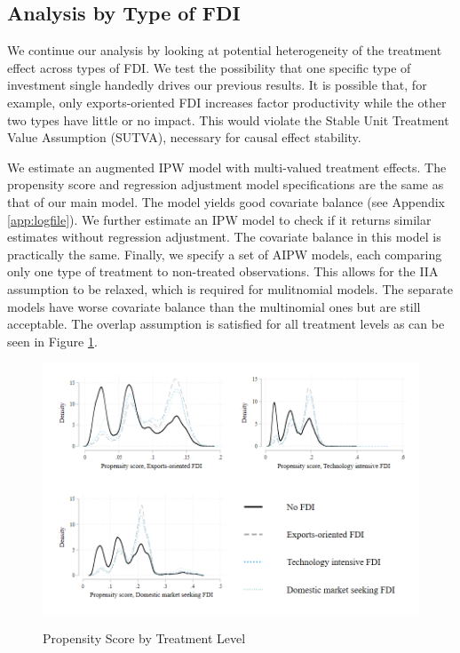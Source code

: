 \documentclass[a4paper,11pt]{scrartcl}
\begin{document}
\subsection{Analysis by Type of FDI}

We continue our analysis by looking at potential heterogeneity of the treatment effect across types of FDI. We test the possibility that one specific type of investment single handedly drives our previous results. It is possible that, for example, only exports-oriented FDI increases factor productivity while the other two types have little or no impact. This would violate the Stable Unit Treatment Value Assumption (SUTVA), necessary for causal effect stability. 

We estimate an augmented IPW model with multi-valued treatment effects. The propensity score and regression adjustment model specifications are the same as that of our main model. The model yields good covariate balance (see Appendix \ref{app:logfile}). We further estimate an IPW model to check if it returns similar estimates without regression adjustment. The covariate balance in this model is practically the same. Finally, we specify a set of AIPW models, each comparing only one type of treatment to non-treated observations. This allows for the IIA assumption to be relaxed, which is required for mulitnomial models. The separate models have worse covariate balance than the multinomial ones but are still acceptable. The overlap assumption is satisfied for all treatment levels as can be seen in Figure \ref{fig:over_typ}. 

\begin{figure}[h]
	
	\caption{Propensity Score by Treatment Level}
	\includegraphics[width=\linewidth]{overlap_type.png}
	\label{fig:over_typ}
 
\end{figure}
\FloatBarrier
\end{document}
